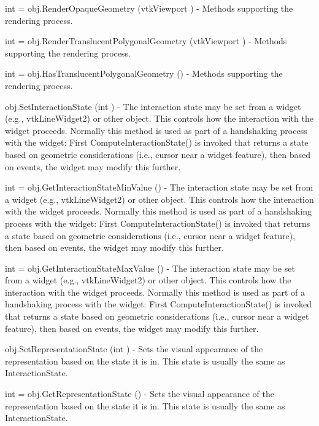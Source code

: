 \begin{DoxyItemize}
\item {\ttfamily int = obj.\-Render\-Opaque\-Geometry (vtk\-Viewport )} -\/ Methods supporting the rendering process.  
\item {\ttfamily int = obj.\-Render\-Translucent\-Polygonal\-Geometry (vtk\-Viewport )} -\/ Methods supporting the rendering process.  
\item {\ttfamily int = obj.\-Has\-Translucent\-Polygonal\-Geometry ()} -\/ Methods supporting the rendering process.  
\item {\ttfamily obj.\-Set\-Interaction\-State (int )} -\/ The interaction state may be set from a widget (e.\-g., vtk\-Line\-Widget2) or other object. This controls how the interaction with the widget proceeds. Normally this method is used as part of a handshaking process with the widget\-: First Compute\-Interaction\-State() is invoked that returns a state based on geometric considerations (i.\-e., cursor near a widget feature), then based on events, the widget may modify this further.  
\item {\ttfamily int = obj.\-Get\-Interaction\-State\-Min\-Value ()} -\/ The interaction state may be set from a widget (e.\-g., vtk\-Line\-Widget2) or other object. This controls how the interaction with the widget proceeds. Normally this method is used as part of a handshaking process with the widget\-: First Compute\-Interaction\-State() is invoked that returns a state based on geometric considerations (i.\-e., cursor near a widget feature), then based on events, the widget may modify this further.  
\item {\ttfamily int = obj.\-Get\-Interaction\-State\-Max\-Value ()} -\/ The interaction state may be set from a widget (e.\-g., vtk\-Line\-Widget2) or other object. This controls how the interaction with the widget proceeds. Normally this method is used as part of a handshaking process with the widget\-: First Compute\-Interaction\-State() is invoked that returns a state based on geometric considerations (i.\-e., cursor near a widget feature), then based on events, the widget may modify this further.  
\item {\ttfamily obj.\-Set\-Representation\-State (int )} -\/ Sets the visual appearance of the representation based on the state it is in. This state is usually the same as Interaction\-State.  
\item {\ttfamily int = obj.\-Get\-Representation\-State ()} -\/ Sets the visual appearance of the representation based on the state it is in. This state is usually the same as Interaction\-State.  

\end{DoxyItemize}
